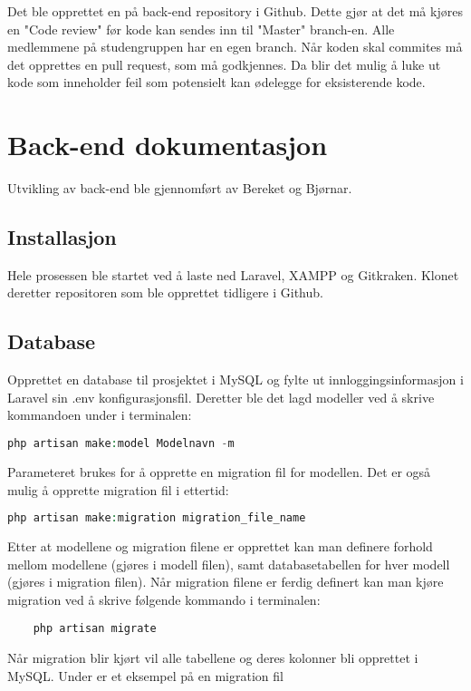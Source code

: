 Det ble opprettet en  på back-end repository i Github. Dette gjør at det må kjøres en "Code review" før kode kan sendes inn til "Master" branch-en. Alle medlemmene på studengruppen har en egen branch.
Når koden skal commites må det opprettes en pull request, som må godkjennes. Da blir det mulig å luke ut kode som inneholder feil som potensielt kan ødelegge for eksisterende kode.

\section{Back-end dokumentasjon}
Utvikling av back-end ble gjennomført av Bereket og Bjørnar. 

\subsection{Installasjon}
Hele prosessen ble startet ved å laste ned Laravel, XAMPP og Gitkraken. Klonet deretter repositoren som ble opprettet tidligere i Github.

\subsection{Database}
Opprettet en database til prosjektet i MySQL og fylte ut innloggingsinformasjon i Laravel sin .env konfigurasjonsfil. Deretter ble det lagd modeller ved å skrive kommandoen under i terminalen: 
\begin{lstlisting}[language=PHP]
    php artisan make:model Modelnavn -m
\end{lstlisting}
Parameteret  brukes for å opprette en migration fil for modellen. Det er også mulig å opprette migration fil i ettertid: 
\begin{lstlisting}[language=PHP]
    php artisan make:migration migration_file_name
\end{lstlisting}
Etter at modellene og migration filene er opprettet kan man definere forhold mellom modellene (gjøres i modell filen), samt databasetabellen for hver modell (gjøres i migration filen).
Når migration filene er ferdig definert kan man kjøre migration ved å skrive følgende kommando i terminalen:
\begin{lstlisting}
    php artisan migrate
\end{lstlisting}
Når migration blir kjørt vil alle tabellene og deres kolonner bli opprettet i MySQL.
Under er et eksempel på en migration fil


